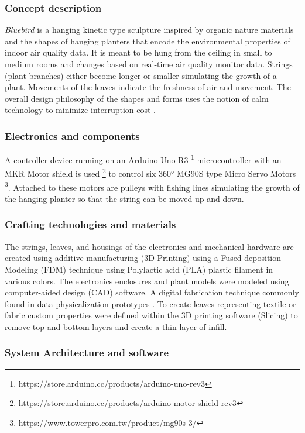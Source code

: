 \subsubsection{Concept description}

\textit{Bluebird} is a hanging kinetic type sculpture inspired by organic nature materials and the shapes of hanging planters that encode the environmental properties of indoor air quality data. It is meant to be hung from the ceiling in small to medium rooms and changes based on real-time air quality monitor data. Strings (plant branches) either become longer or smaller simulating the growth of a plant. Movements of the leaves indicate the freshness of air and movement. The overall design philosophy of the shapes and forms uses the notion of calm technology to minimize interruption cost \cite{case_calm_2016}. 

\subsubsection{Electronics and components}

A controller device running on an Arduino Uno R3 \footnote{https://store.arduino.cc/products/arduino-uno-rev3} microcontroller with an MKR Motor shield is used \footnote{https://store.arduino.cc/products/arduino-motor-shield-rev3} to control six 360° MG90S type Micro Servo Motors \footnote{https://www.towerpro.com.tw/product/mg90s-3/}. Attached to these motors are pulleys with fishing lines simulating the growth of the hanging planter so that the string can be moved up and down.


\subsubsection{Crafting technologies and materials}
The strings, leaves, and housings of the electronics and mechanical hardware are created using additive manufacturing (3D Printing) using a Fused deposition Modeling (FDM) technique using Polylactic acid (PLA) plastic filament in various colors. The electronics enclosures and plant models were modeled using computer-aided design (CAD) software. A digital fabrication technique commonly found in data physicalization prototypes \cite{anhalt_university_germany_design_2022}. To create leaves representing textile or fabric custom properties were defined within the 3D printing software (Slicing) to remove top and bottom layers and create a thin layer of infill.

\subsubsection{System Architecture and software}

